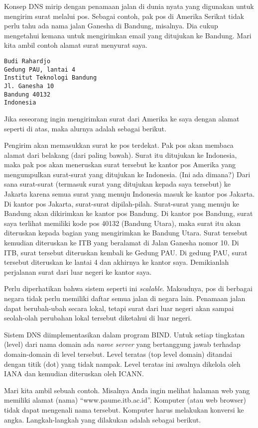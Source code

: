 Konsep DNS mirip dengan penamaan jalan di dunia nyata yang digunakan untuk
mengirim surat melalui pos. Sebagai contoh, pak pos di Amerika Serikat tidak
perlu tahu ada nama jalan Ganesha di Bandung, misalnya. Dia cukup mengetahui
kemana untuk mengirimkan email yang ditujukan ke Bandung. Mari kita ambil
contoh alamat surat menyurat saya.

\begin{verbatim}
Budi Rahardjo
Gedung PAU, lantai 4
Institut Teknologi Bandung
Jl. Ganesha 10
Bandung 40132
Indonesia
\end{verbatim}

Jika seseorang ingin mengirimkan surat dari Amerika ke saya dengan alamat
seperti di atas, maka alurnya adalah sebagai berikut.

Pengirim akan memasukkan surat ke pos terdekat. Pak pos akan membaca alamat
dari belakang (dari paling bawah). Surat itu ditujukan ke Indonesia, maka pak
pos akan meneruskan surat tersebut ke kantor pos Amerika yang mengumpulkan
surat-surat yang ditujukan ke Indonesia. (Ini ada dimana?) Dari sana
surat-surat (termasuk surat yang ditujukan kepada saya tersebut) ke Jakarta
karena semua surat yang menuju Indonesia masuk ke kantor pos Jakarta. Di kantor
pos Jakarta, surat-surat dipilah-pilah. Surat-surat yang menuju ke Bandung akan
dikirimkan ke kantor pos Bandung. Di kantor pos Bandung, surat saya terlihat
memiliki kode pos 40132 (Bandung Utara), maka surat itu akan diteruskan kepada
bagian yang mengirimkan ke Bandung Utara. Surat tersebut kemudian diteruskan ke
ITB yang beralamat di Jalan Ganesha nomor 10. Di ITB, surat tersebut diteruskan
kembali ke Gedung PAU. Di gedung PAU, surat tersebut diteruskan ke lantai 4 dan
akhirnya ke kantor saya. Demikianlah perjalanan surat dari luar negeri ke
kantor saya.

Perlu diperhatikan bahwa sistem seperti ini {\em scalable}. Maksudnya, pos di
berbagai negara tidak perlu memiliki daftar semua jalan di negara lain.
Penamaan jalan dapat berubah-ubah secara lokal, tetapi surat dari luar negeri
akan sampai seolah-olah perubahan lokal tersebut diketahui di luar negeri.

Sistem DNS diimplementasikan dalam program BIND.
Untuk setiap tingkatan (level) dari nama domain ada {\em name server} yang
bertanggung jawab terhadap domain-domain di level tersebut. Level teratas (top
level domain) ditandai dengan titik (dot) yang tidak nampak. Level teratas ini
awalnya dikelola oleh IANA dan kemudian diteruskan oleh ICANN.

Mari kita ambil sebuah contoh. Misalnya Anda ingin melihat halaman web yang
memiliki alamat (nama) ``www.paume.itb.ac.id''. Komputer (atau web browser)
tidak dapat mengenali nama tersebut. Komputer harus melakukan konversi ke
angka. Langkah-langkah yang dilakukan adalah sebagai berikut.


